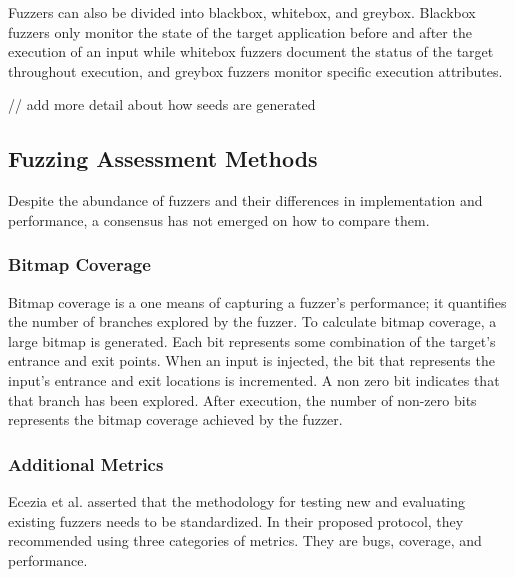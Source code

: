 Fuzzers can also be divided into blackbox, whitebox, and greybox. Blackbox fuzzers only monitor the 
state of the target application before and after the execution of an input while whitebox fuzzers 
document the status of the target throughout execution, and greybox fuzzers monitor specific 
execution attributes. \cite{Zhu}

// add more detail about how seeds are generated

\subsection{Fuzzing Assessment Methods}
Despite the abundance of fuzzers and their differences in implementation and performance, a consensus has not emerged on how to compare them.

\subsubsection{Bitmap Coverage}
Bitmap coverage is a one means of capturing a fuzzer's performance; it quantifies the number of branches explored by the fuzzer. To calculate bitmap coverage, a large bitmap is generated. Each bit represents some combination of the target's entrance and exit points. When an input is injected, the bit that represents the input's entrance and exit locations is incremented. A non zero bit indicates that that branch has been explored. After execution, the number of non-zero bits represents the bitmap coverage achieved by the fuzzer. \cite{AFLGitHub}

\subsubsection{Additional Metrics}
Ecezia et al. asserted that the methodology for testing new and evaluating 
existing fuzzers needs to be standardized. In their proposed protocol, 
they recommended using three categories of metrics. They are bugs, 
coverage, and performance. 

